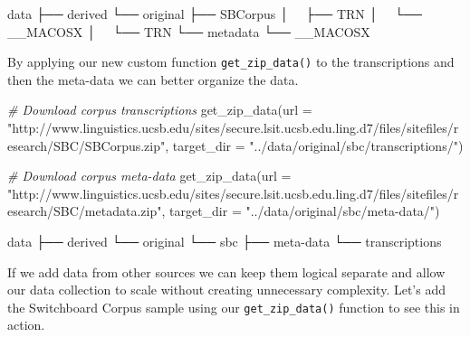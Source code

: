 \documentclass[
  letterpaper,
]{scrbook}
\newenvironment{Shaded}{\begin{snugshade}}{\end{snugshade}}
\newcommand{\AttributeTok}[1]{\textcolor[rgb]{0.00,0.00,0.00}{#1}}
\newcommand{\CommentTok}[1]{\textcolor[rgb]{0.00,0.00,0.00}{\textit{#1}}}
\newcommand{\ExtensionTok}[1]{\textcolor[rgb]{0.00,0.00,0.00}{#1}}
\newcommand{\FunctionTok}[1]{\textcolor[rgb]{0.00,0.00,0.00}{#1}}
\newcommand{\NormalTok}[1]{\textcolor[rgb]{0.00,0.00,0.00}{#1}}
\newcommand{\StringTok}[1]{\textcolor[rgb]{0.00,0.00,0.00}{#1}}
\begin{document}
\begin{Shaded}
\begin{Highlighting}[]
\ExtensionTok{data}
\ExtensionTok{├──}\NormalTok{ derived}
\ExtensionTok{└──}\NormalTok{ original}
    \ExtensionTok{├──}\NormalTok{ SBCorpus}
    \ExtensionTok{│  }\NormalTok{ ├── TRN}
    \ExtensionTok{│  }\NormalTok{ └── \_\_MACOSX}
    \ExtensionTok{│  }\NormalTok{     └── TRN}
    \ExtensionTok{└──}\NormalTok{ metadata}
        \ExtensionTok{└──}\NormalTok{ \_\_MACOSX}
\end{Highlighting}
\end{Shaded}

By applying our new custom function \texttt{get\_zip\_data()} to the
transcriptions and then the meta-data we can better organize the data.

\begin{Shaded}
\begin{Highlighting}[]
\CommentTok{\# Download corpus transcriptions}
\FunctionTok{get\_zip\_data}\NormalTok{(}\AttributeTok{url =} \StringTok{"http://www.linguistics.ucsb.edu/sites/secure.lsit.ucsb.edu.ling.d7/files/sitefiles/research/SBC/SBCorpus.zip"}\NormalTok{, }\AttributeTok{target\_dir =} \StringTok{"../data/original/sbc/transcriptions/"}\NormalTok{)}

\CommentTok{\# Download corpus meta{-}data}
\FunctionTok{get\_zip\_data}\NormalTok{(}\AttributeTok{url =} \StringTok{"http://www.linguistics.ucsb.edu/sites/secure.lsit.ucsb.edu.ling.d7/files/sitefiles/research/SBC/metadata.zip"}\NormalTok{, }\AttributeTok{target\_dir =} \StringTok{"../data/original/sbc/meta{-}data/"}\NormalTok{)}
\end{Highlighting}
\end{Shaded}

\begin{Shaded}
\begin{Highlighting}[]
\ExtensionTok{data}
\ExtensionTok{├──}\NormalTok{ derived}
\ExtensionTok{└──}\NormalTok{ original}
    \ExtensionTok{└──}\NormalTok{ sbc}
        \ExtensionTok{├──}\NormalTok{ meta{-}data}
        \ExtensionTok{└──}\NormalTok{ transcriptions}
\end{Highlighting}
\end{Shaded}

If we add data from other sources we can keep them logical separate and
allow our data collection to scale without creating unnecessary
complexity. Let's add the Switchboard Corpus sample using our
\texttt{get\_zip\_data()} function to see this in action.
\end{document}

